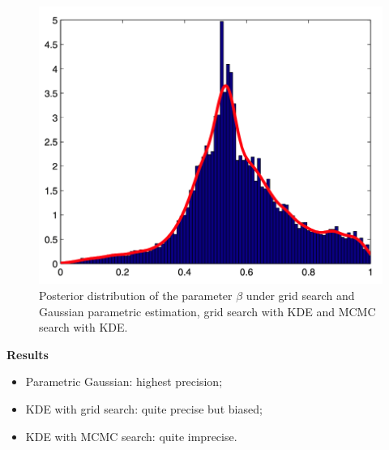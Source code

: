 \documentclass[10pt]{beamer}
\begin{document}
\begin{frame}[c]
\begin{figure}
		\includegraphics[scale=.11]{figures/grazzini_2017_mcmc.png}
		\caption{Posterior distribution of the parameter $\beta$ under grid search and Gaussian parametric estimation, grid search with KDE and MCMC search with KDE.}
	\end{figure} \vspace*{-.5cm}

	\alert{\textbf{Results}}
	\begin{itemize}
		\item Parametric Gaussian: highest precision;
		\item KDE with grid search: quite precise but biased;
		\item KDE with MCMC search: quite imprecise.
	\end{itemize} \bigskip
\end{frame}
\end{document}
